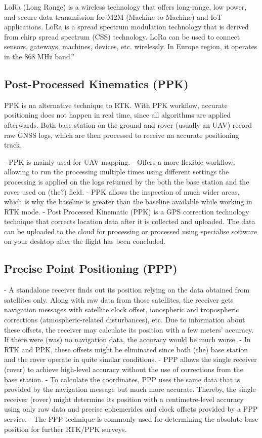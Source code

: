 LoRa (Long Range) is a wireless technology that offers long-range, low power, and secure data transmission for M2M (Machine to Machine) and IoT applications. LoRa is a spread spectrum modulation technology that is derived from chirp spread spectrum (CSS) technology. LoRa can be used to connect sensors, gateways, machines, devices, etc. wirelessly. In Europe region, it operates in the 868 MHz band.'' %

\subsection{Post-Processed Kinematics (PPK)}\label{sec:II_gnssAug_ppk}
PPK is na alternative technique to RTK. With PPK workflow, accurate positioning does not happen in real time, since all algorithms are applied afterwards. Both base station on the ground and rover (usually an UAV) record raw GNSS logs, which are then processed to receive na accurate positioning track.

- PPK is mainly used for UAV mapping.
- Offers a more flexible workflow, allowing to run the processing multiple times using different settings the processing is applied on the logs returned by the both the base station and the rover used on (the?) field.
- PPK allows the inspection of much wider areas, which is why the baseline is greater than the baseline available while working in RTK mode.
- Post Processed Kinematic (PPK) is a GPS correction technology technique that corrects location data after it is collected and uploaded. The data can be uploaded to the cloud for processing or processed using specialise software on your desktop after the flight has been concluded.

\subsection{Precise Point Positioning (PPP)}\label{sec:II_gnssAug_ppp}
- A standalone receiver finds out its position relying on the data obtained from satellites only. Along with raw data from those satellites, the receiver gets navigation messages with satellite clock offset, ionospheric and tropospheric corrections (atmospheric-related disturbances), etc. Due to information about these offsets, the receiver may calculate its position with a few meters' accuracy. If there were (was) no navigation data, the accuracy would be much worse.
- In RTK and PPK, these offsets might be eliminated since both (the) base station and the rover operate in quite similar conditions.
- PPP allows the single receiver (rover) to achieve high-level accuracy without the use of corrections from the base station.
- To calculate the coordinates, PPP uses the same data that is provided by the navigation message but much more accurate. Thereby, the single receiver (rover) might determine its position with a centimetre-level accuracy using only raw data and precise ephemerides and clock offsets provided by a PPP service.
- The PPP technique is commonly used for determining the absolute base position for further RTK/PPK surveys.

